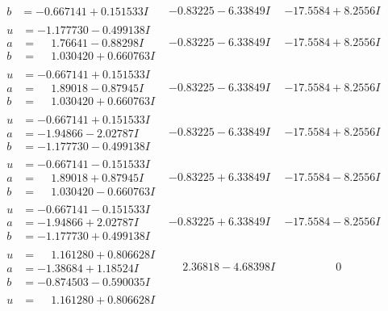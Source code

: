 \documentclass[1p]{elsarticle_modified}
\theoremstyle{definition}
\begin{document}
$$\begin{array}{c|c|c}
\begin{aligned}
b &= -0.667141 + 0.151533 I\end{aligned}
 & -0.83225 - 6.33849 I & -17.5584 + 8.2556 I \\ \hline\begin{aligned}
u &= -1.177730 - 0.499138 I \\
a &= \phantom{-}1.76641 - 0.88298 I \\
b &= \phantom{-}1.030420 + 0.660763 I\end{aligned}
 & -0.83225 - 6.33849 I & -17.5584 + 8.2556 I \\ \hline\begin{aligned}
u &= -0.667141 + 0.151533 I \\
a &= \phantom{-}1.89018 - 0.87945 I \\
b &= \phantom{-}1.030420 + 0.660763 I\end{aligned}
 & -0.83225 - 6.33849 I & -17.5584 + 8.2556 I \\ \hline\begin{aligned}
u &= -0.667141 + 0.151533 I \\
a &= -1.94866 - 2.02787 I \\
b &= -1.177730 - 0.499138 I\end{aligned}
 & -0.83225 - 6.33849 I & -17.5584 + 8.2556 I \\ \hline\begin{aligned}
u &= -0.667141 - 0.151533 I \\
a &= \phantom{-}1.89018 + 0.87945 I \\
b &= \phantom{-}1.030420 - 0.660763 I\end{aligned}
 & -0.83225 + 6.33849 I & -17.5584 - 8.2556 I \\ \hline\begin{aligned}
u &= -0.667141 - 0.151533 I \\
a &= -1.94866 + 2.02787 I \\
b &= -1.177730 + 0.499138 I\end{aligned}
 & -0.83225 + 6.33849 I & -17.5584 - 8.2556 I \\ \hline\begin{aligned}
u &= \phantom{-}1.161280 + 0.806628 I \\
a &= -1.38684 + 1.18524 I \\
b &= -0.874503 - 0.590035 I\end{aligned}
 & \phantom{-}2.36818 - 4.68398 I & \phantom{-0.000000 } 0 \\ \hline\begin{aligned}
u &= \phantom{-}1.161280 + 0.806628 I \\

\end{aligned}
\end{array}$$
\end{document}
